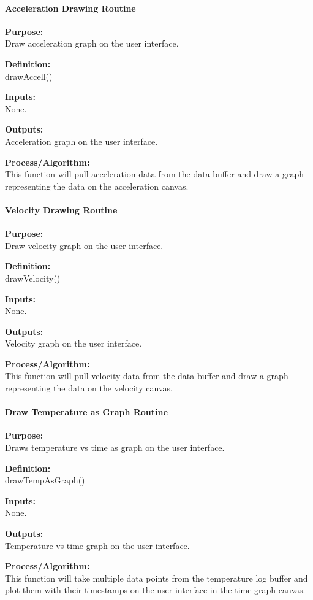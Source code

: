 \documentclass[10pt,draftclsnofoot,onecolumn,retainorgcmds]{IEEEtran}
\begin{document}
\paragraph{Acceleration Drawing Routine}
{\bf Purpose:} \\
Draw acceleration graph on the user interface. \par
{\bf Definition:} \\ 
drawAccell() \par
{\bf Inputs:} \\None. \par
{\bf Outputs:} \\Acceleration graph on the user interface.\par
{\bf Process/Algorithm:} \\
This function will pull acceleration data from the data buffer and draw a graph representing the data on the acceleration canvas. \par

\paragraph{Velocity Drawing Routine}
{\bf Purpose:} \\
Draw velocity graph on the user interface. \par
{\bf Definition:} \\ 
drawVelocity() \par
{\bf Inputs:} \\None. \par
{\bf Outputs:} \\Velocity graph on the user interface.\par
{\bf Process/Algorithm:} \\
This function will pull velocity data from the data buffer and draw a graph representing the data on the velocity canvas. \par

\paragraph{Draw Temperature as Graph Routine}
{\bf Purpose:} \\
Draws temperature vs time as graph on the user interface. \par
{\bf Definition:} \\ 
drawTempAsGraph() \par
{\bf Inputs:} \\None. \par
{\bf Outputs:} \\Temperature vs time graph on the user interface.\par
{\bf Process/Algorithm:} \\
This function will take multiple data points from the temperature log buffer and plot them with their timestamps on the user interface in the time graph canvas.  \par
\end{document}

